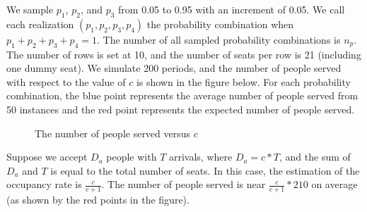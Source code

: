 We sample $p_1$, $p_2$, and $p_3$ from 0.05 to 0.95 with an increment of 0.05. We call each realization $(p_1, p_2, p_3, p_4)$ the probability combination when $p_1 + p_2 + p_3 + p_4 = 1$.
The number of all sampled probability combinations is $n_p$. The number of rows is set at 10, and the number of seats per row is 21 (including one dummy seat). We simulate 200 periods, and the number of people served with respect to the value of $c$ is shown in the figure below. For each probability combination, the blue point represents the average number of people served from 50 instances and the red point represents the expected number of people served.


\begin{figure}[h]
  \centering
  \caption{The number of people served versus $c$}
\end{figure}

Suppose we accept $D_a$ people with $T$ arrivals, where $D_a = c * T$, and the sum of $D_a$ and $T$ is equal to the total number of seats. In this case, the estimation of the occupancy rate is $\frac{c}{c+1}$. The number of people served is near $\frac{c}{c+1} * 210$ on average (as shown by the red points in the figure).


